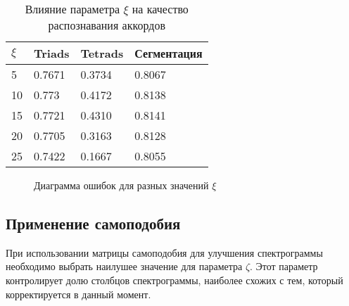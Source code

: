 \begin{table} [htbp]
  \centering
  \parbox{15cm}{\caption{Влияние параметра $\xi$ на качество распознавания
  аккордов} \label{Txi}}
  \begin{tabular}{|l|l|l|l|}
  \hline
  $\xi$ & Triads & Tetrads & Сегментация \\
  \hline
  5 & 0.7671 & 0.3734 & 0.8067 \\
  10 & 0.773 & 0.4172 & 0.8138 \\
  15 & 0.7721 & 0.4310 & 0.8141 \\
  20 & 0.7705 & 0.3163 & 0.8128 \\
  25 & 0.7422 & 0.1667 & 0.8055 \\
  \hline
  \end{tabular}
\end{table}

\begin{figure}[htbp]
  \begin{minipage}[h]{0.49\linewidth}
  \end{minipage}
  \hfill
  \begin{minipage}[h]{0.49\linewidth}
  \end{minipage}
  \hfill
  \begin{minipage}[h]{0.49\linewidth}
  \end{minipage}
  \hfill
  \begin{minipage}[h]{0.49\linewidth}
  \end{minipage}
  \caption{Диаграмма ошибок для разных значений $\xi$}
  \label{img:xi}
\end{figure}

\subsection{Применение самоподобия} \label{ssect3_selfsim}

При использовании матрицы самоподобия для улучшения спектрограммы необходимо
выбрать наилушее значение для параметра $\zeta$. Этот параметр контролирует
долю столбцов спектрограммы, наиболее схожих с тем, который корректируется в
данный момент.

